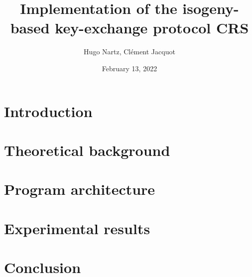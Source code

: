 \documentclass[12pt]{article}
\title{Implementation of the isogeny-based key-exchange protocol CRS}
\author{Hugo Nartz, Cl\'ement Jacquot}
\date{February 13, 2022}
\begin{document}
\maketitle
\renewcommand{\contentsname}{Table of content}
\tableofcontents
\newpage

%

\section*{Introduction}


\section{Theoretical background}


\newpage
\section{Program architecture}


\newpage
\section{Experimental results}


\newpage
{}
\section*{Conclusion}


{}

\end{document}
